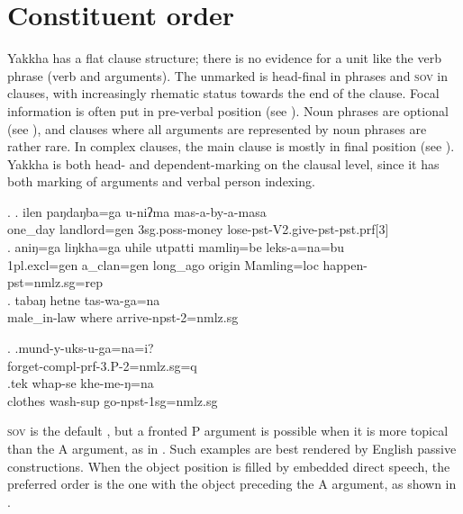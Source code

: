  
\section{Constituent order}\label{simp-cl2}

Yakkha has a flat clause structure; there is no evidence for  a unit like the verb phrase (verb and arguments). The unmarked  is head-final in phrases and \textsc{sov} in clauses, with increasingly rhematic status towards the end of the clause. Focal information is often put in pre-verbal position (see \Next). Noun phrases are optional (see \NNext[a]), and clauses where all arguments are represented by noun phrases are rather rare. In complex clauses, the main clause is mostly in final position (see \NNext[b]). Yakkha is both head- and dependent-marking on the clausal level, since it has both  marking of arguments and verbal person indexing. 

\ex. \ag. ilen paŋdaŋba=ga    u-niʔma   mas-a-by-a-masa\\
 one\_day landlord{\sc =gen} {\sc 3sg.poss-}money lose{\sc -pst-V2.give-pst-pst.prf[3]}\\
 \bg.  aniŋ=ga         liŋkha=ga      uhile         utpatti mamliŋ=be      leks-a=na=bu\\
 	{\sc 1pl.excl=gen}  a\_clan{\sc =gen} long\_ago origin  Mamling{\sc =loc} happen{\sc -pst=nmlz.sg=rep}\\
 	 
 \bg. tabaŋ hetne tas-wa-ga=na\\
 	male\_in-law where arrive-{\sc npst-2=nmlz.sg}\\
 
 \ex. \ag.mund-y-uks-u-ga=na=i?\\
 forget{\sc -compl-prf-3.P-2=nmlz.sg=q}\\
 \bg.tek whap-se khe-me-ŋ=na\\
clothes wash{\sc -sup} go{\sc -npst-1sg=nmlz.sg}\\

 
\textsc{sov} is the default , but a fronted P argument is possible when it is more topical than the A argument, as in  \Next[a]. Such examples are best rendered by English passive constructions. When the object position is filled by embedded direct speech, the preferred order is the one with the object preceding the A argument, as shown in \Next[b]. 

